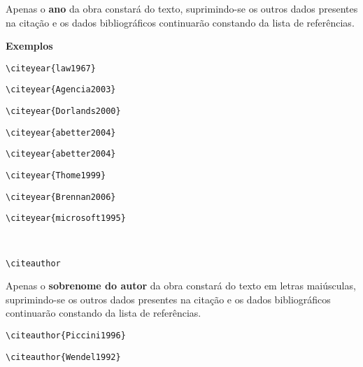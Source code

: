 \begin{alineas}
Apenas o \textbf{ano} da obra constar\'a do texto, suprimindo-se os outros dados presentes na citação e os dados bibliogr\'aficos continuarão constando da lista de refer\^encias. 

\textbf{Exemplos}

\begin{verbatim}
\citeyear{law1967}
\end{verbatim}
\citeyear{law1967}

\begin{verbatim}
\citeyear{Agencia2003}
\end{verbatim}
\citeyear{Agencia2003}

\begin{verbatim}
\citeyear{Dorlands2000}
\end{verbatim}
\citeyear{Dorlands2000}

\begin{verbatim}
\citeyear{abetter2004}
\end{verbatim}
\citeyear{abetter2004}

\begin{verbatim}
\citeyear{abetter2004}
\end{verbatim}
\citeyear{council2001}

\begin{verbatim}
\citeyear{Thome1999}
\end{verbatim}
\citeyear{Thome1999}


\begin{verbatim}
\citeyear{Brennan2006}
\end{verbatim}
\citeyear{Brennan2006}

\begin{verbatim}
\citeyear{microsoft1995}
\end{verbatim}
\citeyear{microsoft1995}\\

\item
\begin{verbatim}
\citeauthor
\end{verbatim}

Apenas o \textbf{sobrenome do autor} da obra constar\'a do texto em letras maiúsculas, suprimindo-se os outros dados presentes na citação e os dados bibliogr\'aficos continuarão constando da lista de refer\^encias. 

{\tiny {\tiny }}\begin{verbatim}
\citeauthor{Piccini1996} 
\end{verbatim}
\citeauthor{Piccini1996} 

\begin{verbatim}
\citeauthor{Wendel1992}
\end{verbatim}
\citeauthor{Wendel1992}


\end{alineas}
